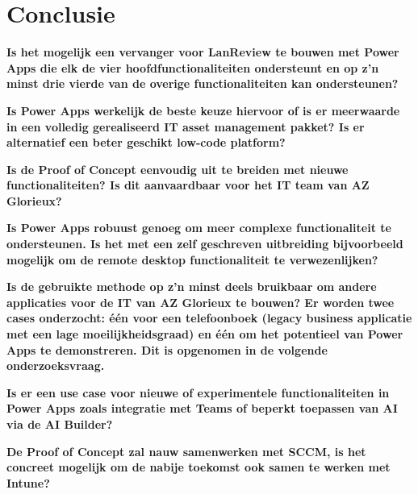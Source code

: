 
\chapter{Conclusie}
\label{ch:conclusie}


\textbf{Is het mogelijk een vervanger voor LanReview te bouwen met Power Apps die elk de vier hoofdfunctionaliteiten ondersteunt en op z'n minst drie vierde van de overige functionaliteiten kan ondersteunen?}

\textbf{Is Power Apps werkelijk de beste keuze hiervoor of is er meerwaarde in een volledig gerealiseerd IT asset management pakket? Is er alternatief een beter geschikt low-code platform?}

\textbf{Is de Proof of Concept eenvoudig uit te breiden met nieuwe functionaliteiten? Is dit aanvaardbaar voor het IT team van AZ Glorieux?}

\textbf{Is Power Apps robuust genoeg om meer complexe functionaliteit te ondersteunen. Is het met een zelf geschreven uitbreiding bijvoorbeeld mogelijk om de remote desktop functionaliteit te verwezenlijken?}

\textbf{Is de gebruikte methode op z'n minst deels bruikbaar om andere applicaties voor de IT van AZ Glorieux te bouwen? Er worden twee cases onderzocht: één voor een telefoonboek (legacy business applicatie met een lage moeilijkheidsgraad) en één om het potentieel van Power Apps te demonstreren. Dit is opgenomen in de volgende onderzoeksvraag.}

\textbf{Is er een use case voor nieuwe of experimentele functionaliteiten in Power Apps zoals integratie met Teams of beperkt toepassen van AI via de AI Builder?}

\textbf{De Proof of Concept zal nauw samenwerken met SCCM, is het concreet mogelijk om de nabije toekomst ook samen te werken met Intune?}

